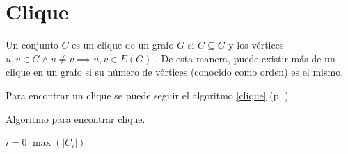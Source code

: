 \documentclass[paper=leter, fontsize=11pt]{scrartcl}
\numberwithin{equation}{section}		%
\numberwithin{figure}{section}			%
\numberwithin{table}{section}				%
\begin{document}
\section{Clique}

Un conjunto $C$ es un clique de un grafo $G$ si $C \subseteq G$ y los vértices $u, v \in G \land u \neq v \implies u, v \in E(G)$ \cite{clique}. De esta manera, puede existir más de un clique en un grafo si su número de vértices (conocido como orden) es el mismo.

Para encontrar un clique se puede seguir el algoritmo \ref{clique} (p. \pageref{clique}).

\begin{algorithm} %
	\caption{Algoritmo para encontrar clique.}
	\label{clique}
	\SetAlgoLined

	\(i = 0\)\;
	\Return \(\max(|C_i|)\)
\end{algorithm}




\end{document}
